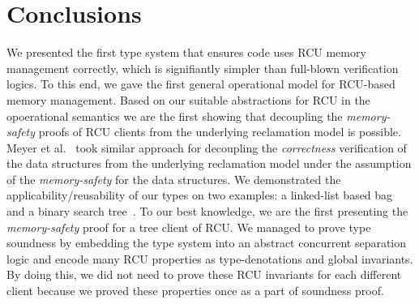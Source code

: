\section{Conclusions}
\label{sec:concls}
We presented the first type system that ensures code uses RCU memory management correctly, which is signifiantly simpler than full-blown verification logics. To this end, we gave the first general operational model for RCU-based memory management. Based on our suitable abstractions for RCU in the opoerational semantics we are the first showing that decoupling the \textit{memory-safety} proofs of RCU clients from the underlying reclamation model is possible. Meyer et al.~\cite{myr} took similar approach for decoupling the \textit{correctness} verification of the data structures from the underlying reclamation model under the assumption of the \textit{memory-safety} for the data structures. We demonstrated the applicability/reusability of our types on two examples: a linked-list based bag~\cite{McKenney2015SomeEO} and a binary search tree~\cite{Arbel:2014:CUR:2611462.2611471}. To our best knowledge, we are the first presenting the \textit{memory-safety} proof for a tree client of RCU. We managed to prove type soundness by embedding the type system into an abstract concurrent separation logic and encode many RCU properties as type-denotations and global invariants. By doing this, we did not need to prove these RCU invariants for each different client because we proved these properties once as a part of soundness proof.
